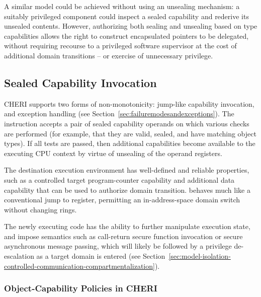 A similar model could be achieved without using an unsealing mechanism: a
suitably privileged component could inspect a sealed capability and rederive
its unsealed contents.
However, authorizing both sealing and unsealing based on type capabilities
allows the right to construct encapsulated pointers to be delegated, without
requiring recourse to a privileged software supervisor at the cost of
additional domain transitions -- or exercise of unnecessary privilege.

\subsection{Sealed Capability Invocation}
\label{sec:model-sealed-capability-invocation}

CHERI supports two forms of non-monotonicity: jump-like capability invocation,
and exception handling (see Section~\ref{sec:failuremodesandexceptions}).
The  instruction accepts a pair of sealed
capability operands on which various checks are performed (for example, that
they are valid, sealed, and have matching object types).
If all tests are passed, then additional capabilities become available to the
executing CPU context by virtue of unsealing of the operand
registers.

The destination execution environment has well-defined and
reliable properties, such as a controlled target program-counter capability
and additional data capability that can be used to authorize domain
transition.
 behaves much like a conventional jump to register, permitting an
in-address-space domain switch without changing rings.

The newly executing code has the ability to further manipulate
execution state, and impose semantics such as call-return secure function
invocation or secure asynchronous message passing,
which will likely be followed by a privilege de-escalation as a target domain
is entered (see
Section~\ref{sec:model-isolation-controlled-communication-compartmentalization}).

\subsubsection{Object-Capability Policies in CHERI}

